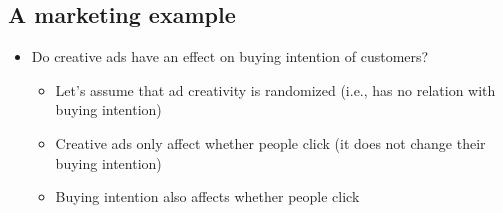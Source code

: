 \documentclass[10pt]{article}
\begin{document}
\subsection{A marketing example}
\begin{itemize}
    \item Do creative ads have an effect on buying intention of customers?
    \begin{itemize}
        \item Let's assume that ad creativity is randomized (i.e., has no relation with buying intention)
        \item Creative ads only affect whether people click (it does not change their buying intention)
        \item Buying intention also affects whether people click 
        \begin{center}
            \begin{tikzpicture}[
                darkblue/.style={circle, draw=blue!20!black, fill=cyan!30, text=black, minimum size=1cm},
                gray/.style={circle, draw=gray, fill=gray!60, text=white, minimum size=1cm},
                lightblue/.style={circle, draw=cyan!50, fill=cyan!15, text=black, minimum size=1cm},
                node distance=2.5cm
            ]
            

\end{tikzpicture}
\end{center}
\end{itemize}
\end{itemize}
\end{document}
